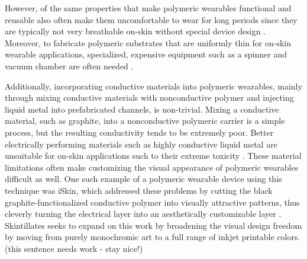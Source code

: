 \documentclass{sigchi}
\begin{document}
However, of the same properties that make polymeric wearables functional and reusable also often make them uncomfortable to wear for long periods since they are typically not very breathable on-skin without special device design \cite{Jang:1gb}. Moreover, to fabricate polymeric substrates that are uniformly thin for on-skin wearable applications, specialized, expensive equipment such as a spinner and vacuum chamber are often needed \cite{Son:2014iya,Yu:2014ht,Anonymous:BBKIC9BZ,Jang:1gb,Muth:2014bv,Anonymous:L82kTfjJ}. 

Additionally, incorporating conductive materials into polymeric wearables, mainly through mixing conductive materials with nonconductive polymer and injecting liquid metal into prefabricated channels, is non-trivial. Mixing a conductive material, such as graphite, into a nonconductive polymeric carrier is a simple process, but the resulting conductivity tends  to  be  extremely poor\cite{Weigel:2015fh}. Better electrically performing materials such as highly conductive liquid  metal  are unsuitable for on-skin applications such to their extreme toxicity \cite{Boley:2014dr}. These material limitations often make customizing the visual appearance of polymeric wearables difficult as well. One such example of a polymeric wearable device using this technique was iSkin, which addressed these problems by cutting the black graphite-functionalized conductive polymer into visually attractive patterns, thus cleverly turning the electrical layer into an aesthetically customizable layer \cite{Weigel:2015fh}. Skintillates seeks to expand on this work by broadening the visual design freedom by moving from purely monochromic art to a full range of inkjet printable colors. (this sentence needs work - stay nice!)

\end{document}
